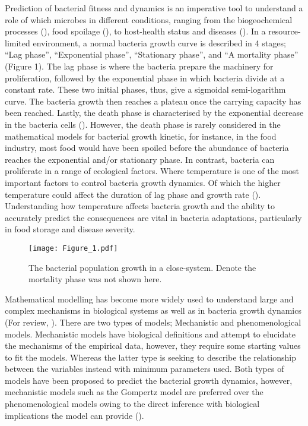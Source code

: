 \documentclass[12pt]{article}
\begin{document}
\begin{linenumbers}
  \noindent Prediction of bacterial fitness and dynamics is an imperative tool to understand a role of which microbes in different conditions, ranging from the biogeochemical processes (\cite{schlesinger_biogeochemistry_1997}), food spoilage (\cite{odeyemi_understanding_2020}), to host-health status and diseases (\cite{feng_identifying_2020}). In a resource-limited environment, a normal bacteria growth curve is described in 4 stages; “Lag phase”, “Exponential phase”, “Stationary phase”, and “A mortality phase” (Figure 1). The lag phase is where the bacteria prepare the machinery for proliferation, followed by the exponential phase in which bacteria divide at a constant rate. These two initial phases, thus, give a sigmoidal semi-logarithm curve. The bacteria growth then reaches a plateau once the carrying capacity has been reached. Lastly, the death phase is characterised by the exponential decrease in the bacteria cells (\cite{mckellar_modeling_2004}). However, the death phase is rarely considered in the mathematical models for bacterial growth kinetic, for instance, in the food industry, most food would have been spoiled before the abundance of bacteria reaches the exponential and/or stationary phase. In contrast, bacteria can proliferate in a range of ecological factors. Where temperature is one of the most important factors to control bacteria growth dynamics. Of which the higher temperature could affect the duration of lag phase and growth rate (\cite{bronikowski_evolutionary_2001}). Understanding how temperature affects bacteria growth and the ability to accurately predict the consequences are vital in bacteria adaptations, particularly in food storage and disease severity.
  
   \begin{figure}[H]
    \centering
    \texttt{[image: Figure\_1.pdf]}
    \caption{The bacterial population growth in a close-system. Denote the mortality phase was not shown here.}
  \end{figure}
  
  \noindent Mathematical modelling has become more widely used to understand large and complex mechanisms in biological systems as well as in bacteria growth dynamics (For review, \cite{de_jong_mathematical_2017}). There are two types of models; Mechanistic and phenomenological models. Mechanistic models have biological definitions and attempt to elucidate the mechanisms of the empirical data, however, they require some starting values to fit the models. Whereas the latter type is seeking to describe the relationship between the variables instead with minimum parameters used. Both types of models have been proposed to predict the bacterial growth dynamics, however, mechanistic models such as the Gompertz model are preferred over the phenomenological models owing to the direct inference with biological implications the model can provide (\cite{peleg_microbial_2011}). 
  

\end{linenumbers}
\end{document}
